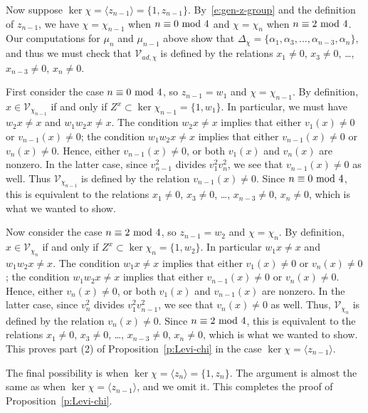 \documentclass[reqno,11pt]{amsart}
\theoremstyle{remark}
\theoremstyle{remark}
\theoremstyle{definition}
\theoremstyle{definition}
\theoremstyle{definition}
\numberwithin{equation}{section}
\renewcommand{\ker}{\operatorname{ker }}
\newcommand{\toric}{\mathcal{V}}
\begin{document}
Now suppose $\ker \chi = \langle z_{n-1} \rangle= \{1, z_{n-1}\}$.  By~\eqref{e:gen-z-group} and the definition of $z_{n-1}$, we have $\chi=\chi_{n-1}$ when $n \equiv 0 \textup{ mod }4$ and $\chi= \chi_n$ when $n \equiv 2 \textup{ mod }4$. Our computations for $\mu_n$ and $\mu_{n-1}$ above show that $\Delta_\chi = \{\alpha_1, \alpha_3, \ldots, \alpha_{n-3}, \alpha_n\}$, and thus we must check that $\toric_{ad, \chi}$ is defined by the relations $x_1 \neq 0$, $x_3 \neq 0$, \ldots, $x_{n-3} \neq 0$, $x_n \neq 0$.

First consider the case $n \equiv 0 \textup{ mod }4$, so $z_{n-1} = w_1$ and $\chi = \chi_{n-1}$. By definition, $x \in \toric_{\chi_{n-1}}$ if and only if $Z^x \subset \ker \chi_{n-1} = \{1, w_1 \}$.  In particular, we must have $w_2x\neq x$ and $w_1w_2x\neq x$.  The condition $w_2 x \neq x$ implies that either $v_1(x) \neq 0$ or $v_{n-1}(x) \neq 0$;
the condition $w_1 w_2 x \neq x$ implies that either $v_{n-1}(x) \neq 0$ or $v_n(x) \neq 0$.  Hence, either $v_{n-1}(x) \neq 0$, or both
$v_1(x)$ and $v_n(x)$ are nonzero.  In the latter case, since $v_{n-1}^2$ divides $v_1^2 v_n^2$, we see that $v_{n-1}(x) \neq 0$ as well.
Thus $\toric_{\chi_{n-1}}$ is defined by the relation $v_{n-1}(x) \neq 0$.  Since $n \equiv 0 \textup{ mod }4$, this is equivalent to the relations
$x_1 \neq 0$, $x_3 \neq 0$, \ldots, $x_{n-3} \neq 0$, $x_n \neq 0$, which is what we wanted to show.

Now consider the case $n \equiv 2 \textup{ mod }4$, so $z_{n-1} = w_2$ and $\chi = \chi_n$.  By definition, $x \in \toric_{\chi_n}$ if and only if $Z^x \subset \ker \chi_n = \{1, w_2 \}$.   In particular $w_1x\neq x$ and $w_1w_2x\neq x$.  The condition $w_1 x \neq x$ implies that either $v_1(x) \neq 0$ or $v_n(x) \neq 0$; the condition $w_1 w_2 x \neq x$ implies that either $v_{n-1}(x) \neq 0$ or $v_n(x) \neq 0$.
Hence, either $v_n(x) \neq 0$, or both $v_1(x)$ and $v_{n-1}(x)$ are nonzero.  In the latter case, since $v_n^2$ divides $v_1^2 v_{n-1}^2$, we see that $v_n(x) \neq 0$ as well.
Thus,  $\toric_{\chi_n}$ is defined by the relation $v_n(x) \neq 0$.  Since $n \equiv 2 \textup{ mod }4$, this is equivalent to the relations
$x_1 \neq 0$, $x_3 \neq 0$, \ldots, $x_{n-3} \neq 0$, $x_n \neq 0$, which is what we wanted to show.  This proves part (2) of Proposition~\ref{p:Levi-chi} in the case $\ker \chi = \langle z_{n-1} \rangle$.

The final possibility is when $\ker \chi = \langle z_n \rangle = \{1,z_n\}$.  The argument is almost the same as when $\ker \chi = \langle z_{n-1} \rangle$, and we omit it. This completes the proof of Proposition~\ref{p:Levi-chi}.
\end{document}
